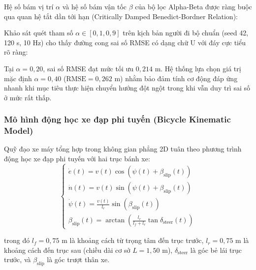 \hspace{0.5cm} Hệ số bám vị trí $\alpha$ và hệ số bám vận tốc $\beta$ của bộ lọc Alpha-Beta được ràng buộc qua quan hệ tắt dần tới hạn (Critically Damped Benedict-Bordner Relation):


Khảo sát quét tham số $\alpha \in [0{,}1, 0{,}9]$ trên kịch bản người đi bộ chuẩn (seed 42, 120 s, 10 Hz) cho thấy đường cong sai số RMSE có dạng chữ U với đáy cực tiểu rõ ràng:



Tại $\alpha = 0{,}20$, sai số RMSE đạt mức tối ưu $0{,}214$ m. Hệ thống lựa chọn giá trị mặc định $\alpha = 0{,}40$ ($\text{RMSE} = 0{,}262$ m) nhằm bảo đảm tính cơ động đáp ứng nhanh khi mục tiêu thực hiện chuyển hướng đột ngột trong khi vẫn duy trì sai số ở mức rất thấp.



\subsubsection{Mô hình động học xe đạp phi tuyến (Bicycle Kinematic Model)}

\hspace{0.5cm} Quỹ đạo xe máy tổng hợp trong không gian phẳng 2D tuân theo phương trình động học xe đạp phi tuyến với hai trục bánh xe:
\begin{equation}
\begin{cases}
\dot{e}(t) = v(t) \cos(\psi(t) + \beta_{\text{slip}}(t)) \\
\dot{n}(t) = v(t) \sin(\psi(t) + \beta_{\text{slip}}(t)) \\
\dot{\psi}(t) = \frac{v(t)}{l_r} \sin(\beta_{\text{slip}}(t)) \\
\beta_{\text{slip}}(t) = \arctan\left( \frac{l_r}{l_f + l_r} \tan\delta_{\text{steer}}(t) \right)
\end{cases}
\label{eq:bicycle-kinematic-model}
\end{equation}

trong đó $l_f = 0{,}75$ m là khoảng cách từ trọng tâm đến trục trước, $l_r = 0{,}75$ m là khoảng cách đến trục sau (chiều dài cơ sở $L = 1{,}50$ m), $\delta_{\text{steer}}$ là góc bẻ lái trục trước, và $\beta_{\text{slip}}$ là góc trượt thân xe.

